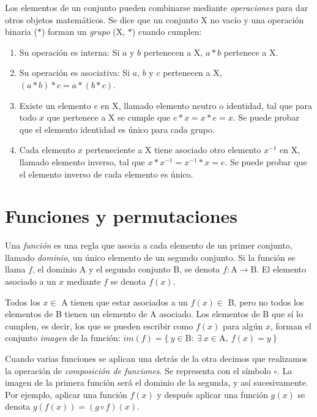 		Los elementos de un conjunto pueden combinarse mediante \emph{operaciones} para dar otros objetos matemáticos. Se dice que un conjunto X no vacío y una operación binaria ($\ast$) forman un \emph{grupo} (X, $\ast$) cuando cumplen:
	
		\begin{enumerate}
			\item{Su operación es interna: Si $a$ y $b$ pertenecen a X, $a\ast b$ pertenece a X.}		
			\item{Su operación es asociativa: Si $a$, $b$ y $c$ pertenecen a X, $(a\ast b)\ast c=a\ast(b\ast c)$. }
			\item{Existe un elemento $e$ en X, llamado elemento neutro o identidad, tal que para todo $x$ que pertenece a X se cumple que $e\ast x = x\ast e = x$. Se puede probar que el elemento identidad es único para cada grupo.}
			\item{Cada elemento $x$ perteneciente a X tiene asociado otro elemento $x^{-1}$ en X, llamado elemento inverso, tal que $x \ast x^{-1} = x^{-1}  \ast x = e$. Se puede probar que el elemento inverso de cada elemento es único.}		
		\end{enumerate}
	
	\section{Funciones y permutaciones}
		Una \emph{función} es una regla que asocia a cada elemento de un primer conjunto, llamado \emph{dominio}, un único elemento de un segundo conjunto. Si la función se llama $f$, el dominio A y el segundo conjunto B, se denota $f:\text{A}\to \text{B}$. El elemento asociado a un $x$ mediante $f$ se denota $f(x)$.
		
		Todos los $x\in$ A tienen que estar asociados a un $f(x)\in$ B, pero no todos los elementos de B tienen un elemento de A asociado. Los elementos de B que sí lo cumplen, es decir, los que se pueden escribir como $f(x)$ para algún $x$, forman el conjunto \emph{imagen} de la función: $im(f)=\{\ y\in \text{B}:\ \exists\ x \in \text{A},\ f(x)=y\ \}$
		
		Cuando varias funciones se aplican una detrás de la otra decimos que realizamos la operación de \textit{composición de funciones}. Se representa con el símbolo $\circ$. La imagen de la primera función será el dominio de la segunda, y así sucesivamente. Por ejemplo, aplicar una función $f(x)$ y después aplicar una función $g(x)$ se denota $g(f(x))=(g\circ f)(x)$.
		
